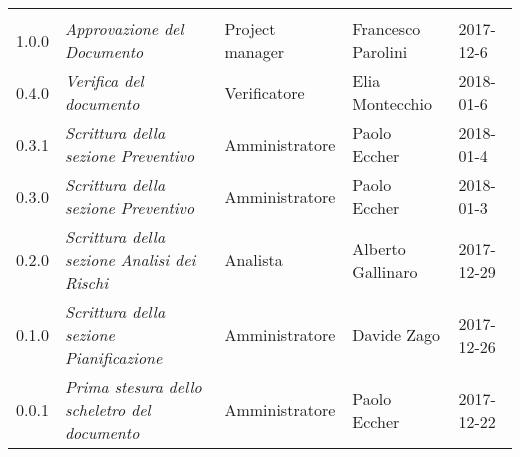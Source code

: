 \newpage 
\section*{}
\begin{table}[H]
	\centering
	\begin{tabular}{p{4cm}|C{3cm}|C{3cm}|C{3cm}|R{2cm}}
		
		 & & & &  \\
		
		
		1.0.0 &\emph{Approvazione del Documento} & Project manager & Francesco Parolini & 2017-12-6 \\
		\hline
		
		0.4.0 &\emph{Verifica del documento} & Verificatore & Elia Montecchio & 2018-01-6 \\
		\hline
		
		0.3.1 &\emph{Scrittura della sezione Preventivo} & Amministratore & Paolo Eccher  & 2018-01-4 \\
		\hline
		
		0.3.0 &\emph{Scrittura della sezione Preventivo} & Amministratore & Paolo Eccher & 2018-01-3 \\
		\hline
		
		0.2.0 &\emph{Scrittura della sezione Analisi dei Rischi} & Analista & Alberto Gallinaro & 2017-12-29 \\
		\hline
		
		0.1.0 &\emph{Scrittura della sezione Pianificazione} & Amministratore & Davide Zago & 2017-12-26 \\
		\hline
		
		0.0.1 &\emph{Prima stesura dello scheletro del documento} & Amministratore & Paolo Eccher & 2017-12-22 \\
		
	\end{tabular}
	
\end{table}


\clearpage